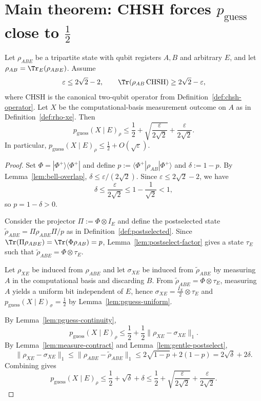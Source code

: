 \section[Main theorem: CHSH forces pguess close to 1/2]{Main theorem: CHSH forces $p_{\mathrm{guess}}$ close to $\tfrac12$}

\begin{theorem}
\label{thm:chsh-to-pguess}
\notready
Let $\rho_{ABE}$ be a tripartite state with qubit registers $A,B$ and arbitrary $E$, and let $\rho_{AB}=\Tr_E(\rho_{ABE})$.
Assume
\[
\varepsilon \le 2\sqrt2-2,
\qquad
\Tr(\rho_{AB}\,\mathrm{CHSH})\ge 2\sqrt2-\varepsilon,
\]
where $\mathrm{CHSH}$ is the canonical two-qubit operator from Definition~\ref{def:chsh-operator}.
Let $X$ be the computational-basis measurement outcome on $A$ as in Definition~\ref{def:rho-xe}.
Then
\[
 p_{\mathrm{guess}}(X\mid E)_\rho \le \frac12 + \sqrt{\frac{\varepsilon}{2\sqrt2}} + \frac{\varepsilon}{2\sqrt2}.
\]
In particular, $p_{\mathrm{guess}}(X\mid E)_\rho\le \tfrac12 + O(\sqrt\varepsilon)$.
\end{theorem}

\begin{proof}
Set $\Phi=|\Phi^+\rangle\!\langle\Phi^+|$ and define $p:=\langle\Phi^+|\rho_{AB}|\Phi^+\rangle$ and $\delta:=1-p$.
By Lemma~\ref{lem:bell-overlap}, $\delta\le \varepsilon/(2\sqrt2)$.
Since $\varepsilon\le 2\sqrt2-2$, we have
\[
\delta \le \frac{\varepsilon}{2\sqrt2} \le 1-\frac{1}{\sqrt2}<1,
\]
so $p=1-\delta>0$.

Consider the projector $\Pi:=\Phi\otimes I_E$ and define the postselected state $\widetilde\rho_{ABE}=\Pi\rho_{ABE}\Pi/p$ as in Definition~\ref{def:postselected}.
Since $\Tr(\Pi\rho_{ABE})=\Tr(\Phi\rho_{AB})=p$, Lemma~\ref{lem:postselect-factor} gives a state $\tau_E$ such that $\widetilde\rho_{ABE}=\Phi\otimes\tau_E$.

Let $\rho_{XE}$ be induced from $\rho_{ABE}$ and let $\sigma_{XE}$ be induced from $\widetilde\rho_{ABE}$ by measuring $A$ in the computational basis and discarding $B$.
From $\widetilde\rho_{ABE}=\Phi\otimes\tau_E$, measuring $A$ yields a uniform bit independent of $E$, hence $\sigma_{XE}=\tfrac{I_X}{2}\otimes\tau_E$ and $p_{\mathrm{guess}}(X\mid E)_\sigma=\tfrac12$ by Lemma~\ref{lem:pguess-uniform}.

By Lemma~\ref{lem:pguess-continuity},
\[
 p_{\mathrm{guess}}(X\mid E)_\rho \le \frac12 + \frac12\|\rho_{XE}-\sigma_{XE}\|_1.
\]
By Lemma~\ref{lem:measure-contract} and Lemma~\ref{lem:gentle-postselect},
\[
\|\rho_{XE}-\sigma_{XE}\|_1 \le \|\rho_{ABE}-\widetilde\rho_{ABE}\|_1 \le 2\sqrt{1-p}+2(1-p)=2\sqrt\delta+2\delta.
\]
Combining gives
\[
 p_{\mathrm{guess}}(X\mid E)_\rho \le \frac12 + \sqrt\delta+\delta \le \frac12 + \sqrt{\frac{\varepsilon}{2\sqrt2}} + \frac{\varepsilon}{2\sqrt2}.
\]
\end{proof}
